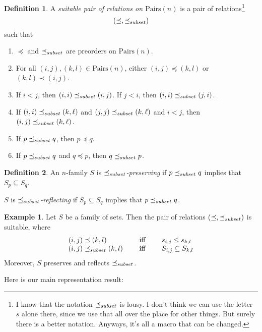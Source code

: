 \documentclass[12pt]{article}
\theoremstyle{definition}
\newtheorem{definition}{Definition}
\newtheorem{example}{Example}
\newcommand{\quadiff}{\quad \mbox{ iff } \quad}
\newcommand{\Pairs}{\mbox{Pairs}}
\newcommand{\precsubseteq}{\preceq_{\scriptsize subset}}
\begin{document}
\begin{definition}
A \emph{suitable pair of relations on $\Pairs(n)$} is a pair of relations\footnote{I know that
the notation $\precsubseteq$ is lousy.   I don't think we can use the letter $s$ alone there,
since we use that all over the place for other things.    But surely there is a better notation.
Anyways, it's all a macro that can be changed.}
\[ (\preceq, \precsubseteq) \]
such that 
\begin{enumerate}
\item $\preceq$ and $\precsubseteq$ are preorders on $\Pairs(n)$.
\item  
 For all $(i,j), (k,l)\in \Pairs(n)$,
 either $(i,j) \preceq (k,l)$ or $(k,l) \prec (i,j)$.
 \item If $i < j$, then $(i,i) \precsubseteq (i,j)$.  If $j < i$, then $(i,i) \precsubseteq (j,i)$. 
 \item If $(i,i) \precsubseteq (k,\ell)$ and $(j,j) \precsubseteq (k,\ell)$ and $i < j$,
 then $(i,j) \precsubseteq (k,\ell)$.
\item If $p \precsubseteq q$, then $p\preceq q$.
\item If $p \precsubseteq q$ and $q\preceq p$, then $q \precsubseteq p$.
\end{enumerate}
\label{def-suitable-pair}
\end{definition}



\begin{definition}
An $n$-family $S$ is \emph{$\precsubseteq$-preserving}
if $p\precsubseteq q$ implies that $S_p \subseteq S_q$.

$S$ is \emph{$\precsubseteq$-reflecting} if 
$S_p \subseteq S_q$ implies that $p\precsubseteq q$. 
\end{definition}


\begin{example} Let  $S$  be a family of sets.
Then the pair of relations $(\preceq, \precsubseteq)$
is suitable, where 
\[ \begin{array}{lcl}
(i,j) \preceq (k,l) & \quadiff  & s_{i,j} \leq s_{k,l}\\
(i,j) \precsubseteq (k,l) & \quadiff  & S_{i,j} \subseteq S_{k,l}\\
\end{array}
\]
Moreover, $S$ preserves and reflects $\precsubseteq$.
\label{example-suitable-pair}
\end{example}

Here is our main representation result:
\end{document}
